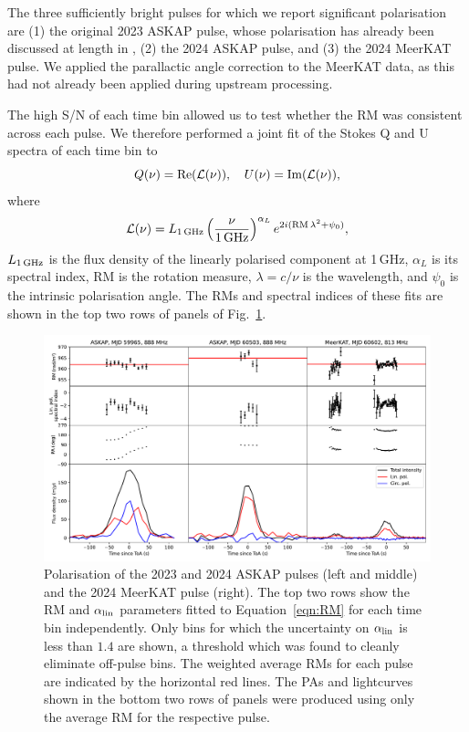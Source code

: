 \documentclass[fleqn,usenatbib]{mnras}
\newcommand{\Fig}{Fig.}
\newcommand{\Eqn}{Equation}
\begin{document}
The three sufficiently bright pulses for which we report significant polarisation are (1) the original 2023 ASKAP pulse, whose polarisation has already been discussed at length in , (2) the 2024 ASKAP pulse, and (3) the 2024 MeerKAT pulse.
We applied the parallactic angle correction to the MeerKAT data, as this had not already been applied during upstream processing.

The high S/N of each time bin allowed us to test whether the RM was consistent across each pulse.
We therefore performed a joint fit of the Stokes Q and U spectra of each time bin to
\begin{equation}
    Q(\nu) = {\rm Re}(\mathcal{L}(\nu)),
    \quad
    U(\nu) = {\rm Im}(\mathcal{L}(\nu)),
    \label{eqn:RM}
\end{equation}
where
\begin{equation}
    \mathcal{L}(\nu)
        = L_{\rm 1\,GHz}\left(\frac{\nu}{\rm 1\,GHz}\right)^{\alpha_L} e^{2i({\rm RM}\,\lambda^2 + \psi_0)},
\end{equation}
$L_{\rm 1\,GHz}$ is the flux density of the linearly polarised component at 1\,GHz, $\alpha_L$ is its spectral index, RM is the rotation measure, $\lambda = c/\nu$ is the wavelength, and $\psi_0$ is the intrinsic polarisation angle.
The RMs and spectral indices of these fits are shown in the top two rows of panels of \Fig~\ref{fig:RM}.

\begin{figure}
    \centering
    \includegraphics[width=0.98\linewidth]{RM.pdf}
    \caption{Polarisation of the 2023 and 2024 ASKAP pulses (left and middle) and the 2024 MeerKAT pulse (right). The top two rows show the RM and $\alpha_{\rm lin}$ parameters fitted to \Eqn~\ref{eqn:RM} for each time bin independently. Only bins for which the uncertainty on $\alpha_{\rm lin}$ is less than $1.4$ are shown, a threshold which was found to cleanly eliminate off-pulse bins. The weighted average RMs for each pulse are indicated by the horizontal red lines. The PAs and lightcurves shown in the bottom two rows of panels were produced using only the average RM for the respective pulse.}
    \label{fig:RM}
\end{figure}
\end{document}
